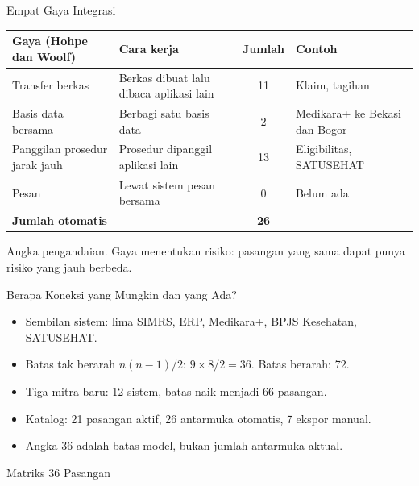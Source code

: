 \documentclass[aspectratio=169, table, 12pt]{beamer}
\begin{document}
\begin{frame}{{\Large Empat Gaya Integrasi}}
  \footnotesize
  \begin{tabularx}{\textwidth}{>{\raggedright\arraybackslash}p{3.6cm}>{\raggedright\arraybackslash}Xc>{\raggedright\arraybackslash}p{3.8cm}}
    \hline
    \textbf{Gaya (Hohpe dan Woolf)} & \textbf{Cara kerja} & \textbf{Jumlah} & \textbf{Contoh} \\
    \hline
    Transfer berkas & Berkas dibuat lalu dibaca aplikasi lain & 11 & Klaim, tagihan \\
    \hline
    Basis data bersama & Berbagi satu basis data & 2 & Medikara+ ke Bekasi dan Bogor \\
    \hline
    Panggilan prosedur jarak jauh & Prosedur dipanggil aplikasi lain & 13 & Eligibilitas, SATUSEHAT \\
    \hline
    Pesan & Lewat sistem pesan bersama & 0 & Belum ada \\
    \hline
    \textbf{Jumlah otomatis} & & \textbf{26} & \\
    \hline
  \end{tabularx}

  \vspace{8pt}
  \small Angka pengandaian. Gaya menentukan risiko: pasangan yang sama dapat punya risiko yang jauh berbeda.
\end{frame}

\begin{frame}{{\Large Berapa Koneksi yang Mungkin dan yang Ada?}}
  \vspace{10pt}
  \begin{itemize}
    \item Sembilan sistem: lima SIMRS, ERP, Medikara+, BPJS Kesehatan, SATUSEHAT.
    \item Batas tak berarah $n(n-1)/2$: $9 \times 8 / 2 = 36$. Batas berarah: 72.
    \item Tiga mitra baru: 12 sistem, batas naik menjadi 66 pasangan.
    \item Katalog: 21 pasangan aktif, 26 antarmuka otomatis, 7 ekspor manual.
    \item Angka 36 adalah batas model, bukan jumlah antarmuka aktual.
  \end{itemize}
\end{frame}

\begin{frame}{{\Large Matriks 36 Pasangan}}
  \centering
\end{frame}
\end{document}
